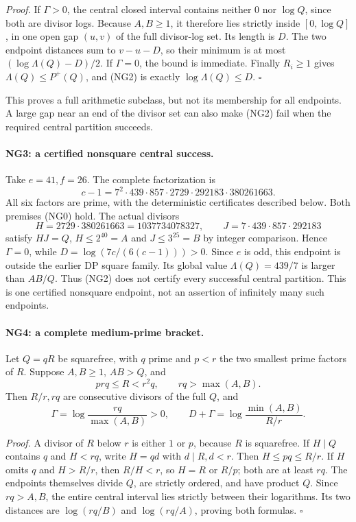 \emph{Proof.} If $\Gamma>0$, the central closed interval contains
neither $0$ nor $\log Q$, since both are divisor logs. Because
$A,B\geq1$, it therefore lies strictly inside $[0,\log Q]$, in one
open gap $(u,v)$ of the full divisor-log set. Its length is $D$.
The two endpoint distances sum to $v-u-D$, so their minimum is at
most $(\log\Lambda(Q)-D)/2$. If $\Gamma=0$, the bound is immediate.
Finally $R_i\geq1$ gives $\Lambda(Q)\leq P^+(Q)$, and (NG2) is
exactly $\log\Lambda(Q)\leq D$. $\square$

This proves a full arithmetic subclass, but not its membership for
all endpoints. A large gap near an end of the divisor set can also
make (NG2) fail when the required central partition succeeds.

\paragraph{NG3: a certified nonsquare central success.}
Take $e=41,f=26$. The complete factorization is
\[
 c-1=7^2\cdot439\cdot857\cdot2729\cdot292183\cdot380261663.
                                                               \tag{NG3}
\]
All six factors are prime, with the deterministic certificates
described below. Both premises (NG0) hold. The actual divisors
\[
 H=2729\cdot380261663=1037734078327,\qquad
 J=7\cdot439\cdot857\cdot292183
\]
satisfy $HJ=Q$, $H\leq2^{40}=A$ and $J\leq3^{25}=B$ by integer
comparison. Hence $\Gamma=0$, while
$D=\log(7c/(6(c-1)))>0$. Since $e$ is odd, this endpoint is outside
the earlier DP square family. Its global value $\Lambda(Q)=439/7$
is larger than $AB/Q$. Thus (NG2) does not certify every successful
central partition. This is one certified nonsquare endpoint, not an
assertion of infinitely many such endpoints.

\paragraph{NG4: a complete medium-prime bracket.}
Let $Q=qR$ be squarefree, with $q$ prime and $p<r$ the two smallest
prime factors of $R$. Suppose $A,B\geq1$, $AB>Q$, and
\[
 prq\leq R<r^2q,\qquad rq>\max(A,B).                \tag{NG4}
\]
Then $R/r,rq$ are consecutive divisors of the full $Q$, and
\[
 \Gamma=\log\frac{rq}{\max(A,B)}>0,\qquad
 D+\Gamma=\log\frac{\min(A,B)}{R/r}.                \tag{NG5}
\]

\emph{Proof.} A divisor of $R$ below $r$ is either $1$ or $p$,
because $R$ is squarefree. If $H\mid Q$ contains $q$ and $H<rq$,
write $H=qd$ with $d\mid R,d<r$. Then $H\leq pq\leq R/r$.
If $H$ omits $q$ and $H>R/r$, then $R/H<r$, so $H=R$ or $R/p$;
both are at least $rq$. The endpoints themselves divide $Q$, are
strictly ordered, and have product $Q$. Since $rq>A,B$, the entire
central interval lies strictly between their logarithms. Its two
distances are $\log(rq/B)$ and $\log(rq/A)$, proving both formulas.
$\square$

